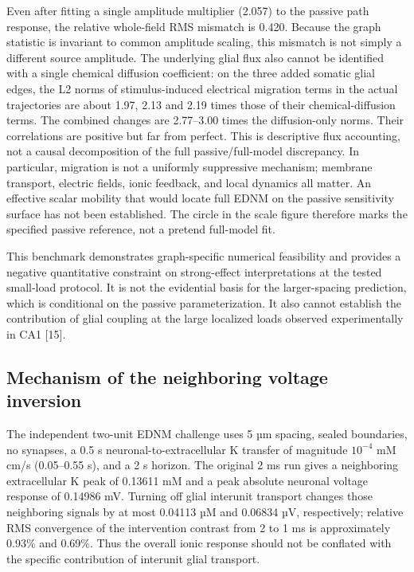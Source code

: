 \documentclass[
  11pt,
]{article}
\begin{document}
Even after fitting a single amplitude multiplier (2.057) to the passive
path response, the relative whole-field RMS mismatch is 0.420. Because
the graph statistic is invariant to common amplitude scaling, this
mismatch is not simply a different source amplitude. The underlying
glial flux also cannot be identified with a single chemical diffusion
coefficient: on the three added somatic glial edges, the L2 norms of
stimulus-induced electrical migration terms in the actual trajectories
are about 1.97, 2.13 and 2.19 times those of their chemical-diffusion
terms. The combined changes are 2.77--3.00 times the diffusion-only
norms. Their correlations are positive but far from perfect. This is
descriptive flux accounting, not a causal decomposition of the full
passive/full-model discrepancy. In particular, migration is not a
uniformly suppressive mechanism; membrane transport, electric fields,
ionic feedback, and local dynamics all matter. An effective scalar
mobility that would locate full EDNM on the passive sensitivity surface
has not been established. The circle in the scale figure therefore marks
the specified passive reference, not a pretend full-model fit.

This benchmark demonstrates graph-specific numerical feasibility and
provides a negative quantitative constraint on strong-effect
interpretations at the tested small-load protocol. It is not the
evidential basis for the larger-spacing prediction, which is conditional
on the passive parameterization. It also cannot establish the
contribution of glial coupling at the large localized loads observed
experimentally in CA1 {[}15{]}.

\subsection{Mechanism of the neighboring voltage
inversion}\label{mechanism-of-the-neighboring-voltage-inversion}

The independent two-unit EDNM challenge uses 5 µm spacing, sealed
boundaries, no synapses, a 0.5 s neuronal-to-extracellular K transfer of
magnitude \(10^{-4}\) mM cm/s (0.05--0.55 s), and a 2 s horizon. The
original 2 ms run gives a neighboring extracellular K peak of 0.13611 mM
and a peak absolute neuronal voltage response of 0.14986 mV. Turning off
glial interunit transport changes those neighboring signals by at most
0.04113 µM and 0.06834 µV, respectively; relative RMS convergence of the
intervention contrast from 2 to 1 ms is approximately 0.93\% and 0.69\%.
Thus the overall ionic response should not be conflated with the
specific contribution of interunit glial transport.
\end{document}
